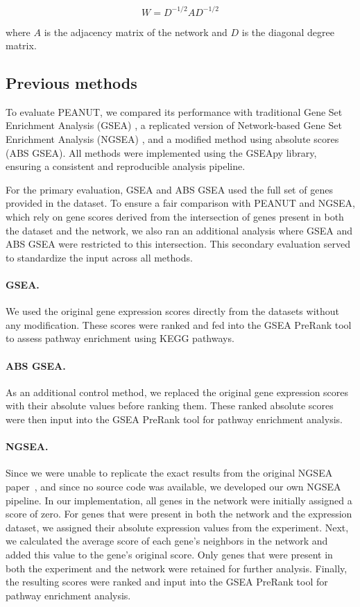 \documentclass{article}
\begin{document}
\[
W = D^{-1/2} A D^{-1/2}
\]

where \(A\) is the adjacency matrix of the network and \(D\) is the diagonal degree matrix. 

\subsection{Previous methods}
To evaluate PEANUT, we compared its performance with traditional Gene Set Enrichment Analysis (GSEA) \cite{Subramanian2005}, a replicated version of Network-based Gene Set Enrichment Analysis (NGSEA) \cite{Han2019}, and a modified method using absolute scores (ABS GSEA). All methods were implemented using the GSEApy library, ensuring a consistent and reproducible analysis pipeline.

For the primary evaluation, GSEA and ABS GSEA used the full set of genes provided in the dataset. To ensure a fair comparison with PEANUT and NGSEA, which rely on gene scores derived from the intersection of genes present in both the dataset and the network, we also ran an additional analysis where GSEA and ABS GSEA were restricted to this intersection. This secondary evaluation served to standardize the input across all methods.


\paragraph{GSEA.}
We used the original gene expression scores directly from the datasets without any modification. These scores were ranked and fed into the GSEA PreRank tool to assess pathway enrichment using KEGG pathways.

\paragraph{ABS GSEA.}
As an additional control method, we replaced the original gene expression scores with their absolute values before ranking them. These ranked absolute scores were then input into the GSEA PreRank tool for pathway enrichment analysis. 

\paragraph{NGSEA.}
Since we were unable to replicate the exact results from the original NGSEA paper~\cite{Han2019}, and since no source code was available, we developed our own NGSEA pipeline. In our implementation, all genes in the network were initially assigned a score of zero. For genes that were present in both the network and the expression dataset, we assigned their absolute expression values from the experiment. Next, we calculated the average score of each gene's neighbors in the network and added this value to the gene's original score. Only genes that were present in both the experiment and the network were retained for further analysis. Finally, the resulting scores were ranked and input into the GSEA PreRank tool for pathway enrichment analysis.
\end{document}
